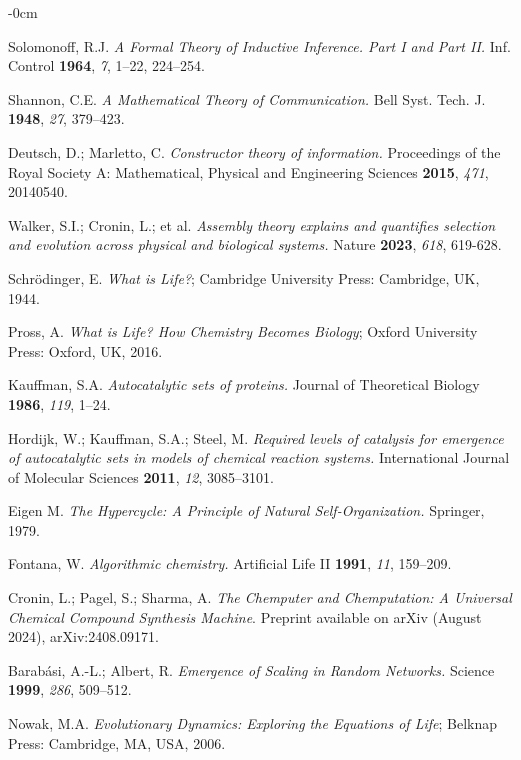 \documentclass[life,article,submit,pdftex,moreauthors]{Definitions/mdpi}
\begin{document}
\begin{adjustwidth}{-\extralength}{0cm}
{\begin{thebibliography}{999}
Solomonoff, R.J. \textit{A Formal Theory of Inductive Inference. Part I and Part II.} Inf. Control \textbf{1964}, \textit{7}, 1–22, 224–254.

Shannon, C.E. \textit{A Mathematical Theory of Communication.} Bell Syst. Tech. J. \textbf{1948}, \textit{27}, 379–423.

Deutsch, D.; Marletto, C. \textit{Constructor theory of information.} Proceedings of the Royal Society A: Mathematical, Physical and Engineering Sciences \textbf{2015}, \textit{471}, 20140540.

Walker, S.I.; Cronin, L.; et al. \textit{Assembly theory explains and quantifies selection and evolution across physical and biological systems.} Nature \textbf{2023}, \textit{618}, 619-628.

Schrödinger, E. \textit{What is Life?}; Cambridge University Press: Cambridge, UK, 1944.

Pross, A. \textit{What is Life? How Chemistry Becomes Biology}; Oxford University Press: Oxford, UK, 2016.

Kauffman, S.A. \textit{Autocatalytic sets of proteins.} Journal of Theoretical Biology \textbf{1986}, \textit{119}, 1–24.

Hordijk, W.; Kauffman, S.A.; Steel, M. \textit{Required levels of catalysis for emergence of autocatalytic sets in models of chemical reaction systems.} International Journal of Molecular Sciences \textbf{2011}, \textit{12}, 3085–3101.

Eigen M. \textit{The Hypercycle: A Principle of Natural Self-Organization.} Springer, 1979.

Fontana, W. \textit{Algorithmic chemistry.} Artificial Life II \textbf{1991}, \textit{11}, 159–209.

Cronin, L.; Pagel, S.; Sharma, A. \textit{The Chemputer and Chemputation: A Universal Chemical Compound Synthesis Machine}. Preprint available on arXiv (August 2024), arXiv:2408.09171.

Barabási, A.-L.; Albert, R. \textit{Emergence of Scaling in Random Networks.} Science \textbf{1999}, \textit{286}, 509–512.

Nowak, M.A. \textit{Evolutionary Dynamics: Exploring the Equations of Life}; Belknap Press: Cambridge, MA, USA, 2006.


\end{thebibliography}}
\end{adjustwidth}
\end{document}
